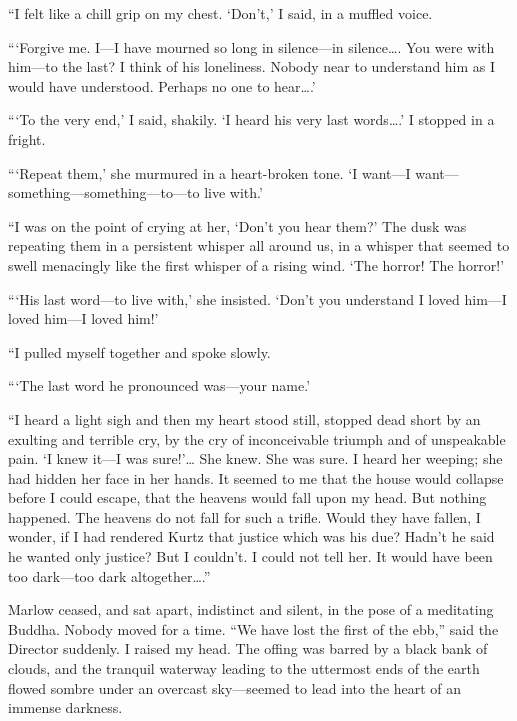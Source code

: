 \documentclass[12pt]{report}
\begin{document}
``I felt like a chill grip on my chest. `Don't,' I said, in a muffled
voice.

```Forgive me. I---I have mourned so long in silence---in
silence\ldots{}. You were with him---to the last? I think of his
loneliness. Nobody near to understand him as I would have understood.
Perhaps no one to hear\ldots{}.'

```To the very end,' I said, shakily. `I heard his very last
words\ldots{}.' I stopped in a fright.

```Repeat them,' she murmured in a heart-broken tone. `I want---I
want---something---something---to---to live with.'

``I was on the point of crying at her, `Don't you hear them?' The dusk
was repeating them in a persistent whisper all around us, in a whisper
that seemed to swell menacingly like the first whisper of a rising wind.
`The horror! The horror!'

```His last word---to live with,' she insisted. `Don't you understand I
loved him---I loved him---I loved him!'

``I pulled myself together and spoke slowly.

```The last word he pronounced was---your name.'

``I heard a light sigh and then my heart stood still, stopped dead short
by an exulting and terrible cry, by the cry of inconceivable triumph and
of unspeakable pain. `I knew it---I was sure!'\ldots{} She knew. She was
sure. I heard her weeping; she had hidden her face in her hands. It
seemed to me that the house would collapse before I could escape, that
the heavens would fall upon my head. But nothing happened. The heavens
do not fall for such a trifle. Would they have fallen, I wonder, if I
had rendered Kurtz that justice which was his due? Hadn't he said he
wanted only justice? But I couldn't. I could not tell her. It would have
been too dark---too dark altogether\ldots{}.''

Marlow ceased, and sat apart, indistinct and silent, in the pose of a
meditating Buddha. Nobody moved for a time. ``We have lost the first of
the ebb,'' said the Director suddenly. I raised my head. The offing was
barred by a black bank of clouds, and the tranquil waterway leading to
the uttermost ends of the earth flowed sombre under an overcast
sky---seemed to lead into the heart of an immense darkness.
\end{document}
